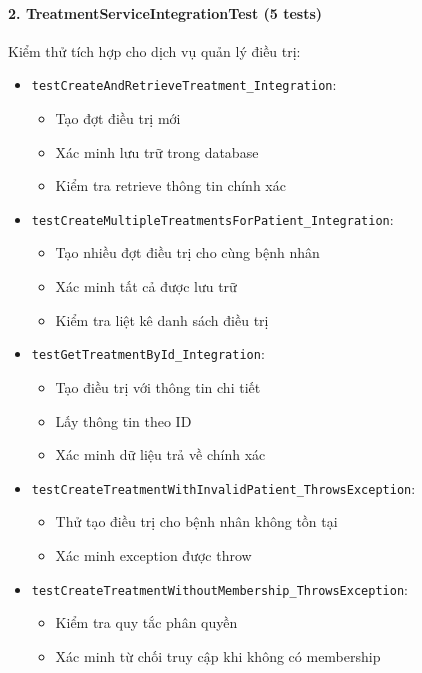 \paragraph{2. TreatmentServiceIntegrationTest (5 tests)}

Kiểm thử tích hợp cho dịch vụ quản lý điều trị:

\begin{itemize}
    \item \texttt{testCreateAndRetrieveTreatment\_Integration}:
    \begin{itemize}
        \item Tạo đợt điều trị mới
        \item Xác minh lưu trữ trong database
        \item Kiểm tra retrieve thông tin chính xác
    \end{itemize}
    
    \item \texttt{testCreateMultipleTreatmentsForPatient\_Integration}:
    \begin{itemize}
        \item Tạo nhiều đợt điều trị cho cùng bệnh nhân
        \item Xác minh tất cả được lưu trữ
        \item Kiểm tra liệt kê danh sách điều trị
    \end{itemize}
    
    \item \texttt{testGetTreatmentById\_Integration}:
    \begin{itemize}
        \item Tạo điều trị với thông tin chi tiết
        \item Lấy thông tin theo ID
        \item Xác minh dữ liệu trả về chính xác
    \end{itemize}
    
    \item \texttt{testCreateTreatmentWithInvalidPatient\_ThrowsException}:
    \begin{itemize}
        \item Thử tạo điều trị cho bệnh nhân không tồn tại
        \item Xác minh exception được throw
    \end{itemize}
    
    \item \texttt{testCreateTreatmentWithoutMembership\_ThrowsException}:
    \begin{itemize}
        \item Kiểm tra quy tắc phân quyền
        \item Xác minh từ chối truy cập khi không có membership
    \end{itemize}
\end{itemize}

